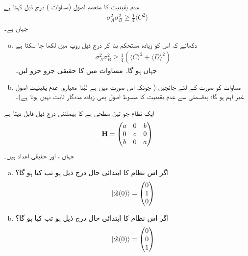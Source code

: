 \quad  عدم   یقینیت  کا   متعمم  اصول (مساوات ) درج  ذیل  کہتا ہے
   \begin{align*} 
\sigma_{A}^{2}\sigma_{B}^{2}\geq\frac{1}{4}\langle C^{2} \rangle 
  \end{align*} 
جہاں  ہے۔
\begin{enumerate}[a.]  
\item
دکھائے کہ اس کو زیادہ  مستحکم  بنا  کر درج  ذیل روپ میں لکھا  جا سکتا ہے
  \begin{align}\label{مساوات_سوال_مستحکم_عدم_یقینیت} 
\sigma_{A}^{2}\sigma_{B}^{2}\geq\frac{1}{4}(\langle C\rangle^{2}+\langle D \rangle ^{2}) 
  \end{align} 
جہاں    ہو گا۔   مساوات   میں  کا حقیقی جزو     جزو  لیں۔  
\item
مساوات    کو      صورت  کے لئے  جانچیں (    چونکہ اس صورت میں       ہے لہٰذا  معیاری عدم یقینیت اصول  غیر اہم   ہو گا؛   بدقسمتی سے عدم  یقینیت  کا  مبسوط اصول بھی زیادہ مددگار ثابت نہیں ہوتا ہے)۔  
\end{enumerate}

ایک نظام جو  تین سطحی ہے کا ہیملٹنی  درج   ذیل  قابل دیتا ہے
  \begin{align*} 
\bold{H}=\begin{pmatrix}
a&0&b\\
0&c&0\\
b&0&a
\end{pmatrix} 
  \end{align*} 
جہاں ،  اور   حقیقی اعداد ہیں۔
\begin{enumerate}[a.]
   \item
    اگر اس نظام کا ابتدائی حال درج  ذیل  ہو تب       کیا ہو گا؟  
  \begin{align*} 
|\s(0) \rangle=\begin{pmatrix}
0\\
1\\
0
\end{pmatrix} 
  \end{align*} 
\item
 اگر اس نظام کا ابتدائی حال درج ذیل  ہو تب    کیا ہو گا؟  
  \begin{align*} 
| \s(0)\rangle =\begin{pmatrix}
0\\
0\\
1
\end{pmatrix} 
  \end{align*} 
\end{enumerate}

